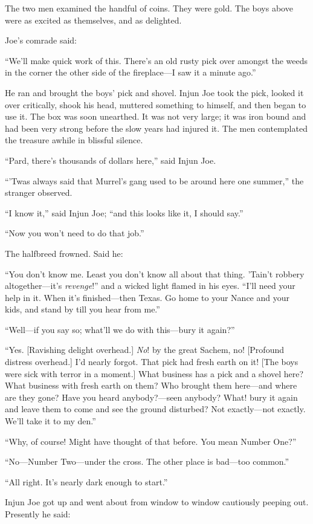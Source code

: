 \documentclass{book}
\begin{document}
The two men examined the handful of coins. They were gold. The boys above were as excited as themselves, and as delighted.

Joe’s comrade said:

“We’ll make quick work of this. There’s an old rusty pick over amongst the weeds in the corner the other side of the fireplace—I saw it a minute ago.”

He ran and brought the boys’ pick and shovel. Injun Joe took the pick, looked it over critically, shook his head, muttered something to himself, and then began to use it. The box was soon unearthed. It was not very large; it was iron bound and had been very strong before the slow years had injured it. The men contemplated the treasure awhile in blissful silence.

“Pard, there’s thousands of dollars here,” said Injun Joe.

“’Twas always said that Murrel’s gang used to be around here one summer,” the stranger observed.

“I know it,” said Injun Joe; “and this looks like it, I should say.”

“Now you won’t need to do that job.”

The halfbreed frowned. Said he:

“You don’t know me. Least you don’t know all about that thing. ’Tain’t robbery altogether—it’s \emph{revenge}!” and a wicked light flamed in his eyes. “I’ll need your help in it. When it’s finished—then Texas. Go home to your Nance and your kids, and stand by till you hear from me.”

“Well—if you say so; what’ll we do with this—bury it again?”

“Yes. [Ravishing delight overhead.] \emph{No}! by the great Sachem, no! [Profound distress overhead.] I’d nearly forgot. That pick had fresh earth on it! [The boys were sick with terror in a moment.] What business has a pick and a shovel here? What business with fresh earth on them? Who brought them here—and where are they gone? Have you heard anybody?—seen anybody? What! bury it again and leave them to come and see the ground disturbed? Not exactly—not exactly. We’ll take it to my den.”

“Why, of course! Might have thought of that before. You mean Number One?”

“No—Number Two—under the cross. The other place is bad—too common.”

“All right. It’s nearly dark enough to start.”

Injun Joe got up and went about from window to window cautiously peeping out. Presently he said:
\end{document}
